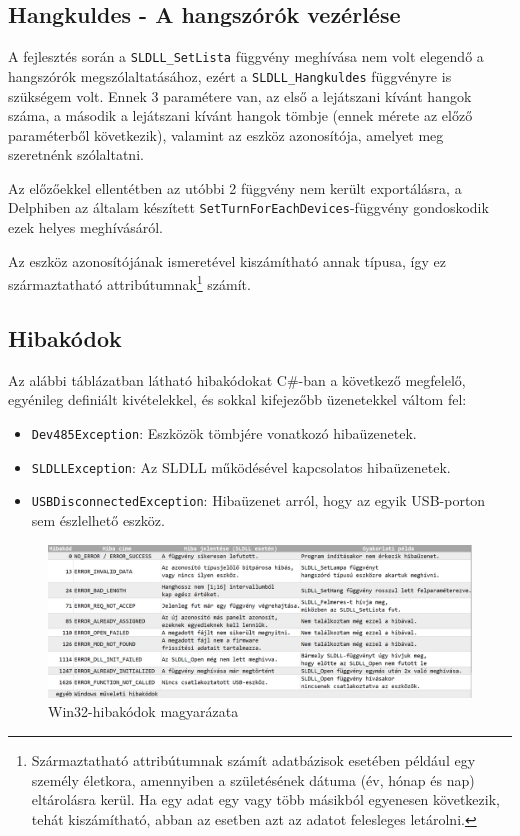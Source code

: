 \documentclass[tocnopagenum]{thesis-ekf}
\begin{document}
	\subsection{Hangkuldes - A hangszórók vezérlése}
	A fejlesztés során a \verb*|SLDLL_SetLista| függvény meghívása nem volt elegendő a hangszórók megszólaltatásához, ezért a \verb*|SLDLL_Hangkuldes| függvényre is szükségem volt. Ennek 3 paramétere van, az első a lejátszani kívánt hangok száma, a második a lejátszani kívánt hangok tömbje (ennek mérete az előző paraméterből következik), valamint az eszköz azonosítója, amelyet meg szeretnénk szólaltatni.
	
	Az előzőekkel ellentétben az utóbbi 2 függvény nem került exportálásra, a Delphiben az általam készített \verb*|SetTurnForEachDevices|-függvény gondoskodik ezek helyes meghívásáról.
	
	Az eszköz azonosítójának ismeretével kiszámítható annak típusa, így ez származtatható attribútumnak\footnote{Származtatható attribútumnak számít adatbázisok esetében például egy személy életkora, amennyiben a születésének dátuma (év, hónap és nap) eltárolásra kerül. Ha egy adat egy vagy több másikból egyenesen következik, tehát kiszámítható, abban az esetben azt az adatot felesleges letárolni.} számít.
	\subsection{Hibakódok}
	Az alábbi táblázatban látható hibakódokat C\#-ban a következő megfelelő, egyénileg definiált kivételekkel, és sokkal kifejezőbb üzenetekkel váltom fel:
	\begin{itemize}
		\item \verb*|Dev485Exception|: Eszközök tömbjére vonatkozó hibaüzenetek.
		\item \verb*|SLDLLException|: Az SLDLL működésével kapcsolatos hibaüzenetek.
		\item \verb*|USBDisconnectedException|: Hibaüzenet arról, hogy az egyik USB-porton sem észlelhető eszköz.
	\end{itemize}

	\begin{figure}[h!]
		\centering
		\hspace*{-0.5in}
		\includegraphics[scale=0.5]{images/errcodes.png}
		\caption[Hibakódok és magyarázataik]{Win32-hibakódok magyarázata}
		\label{fig:errcodes}
	\end{figure}
\end{document}
